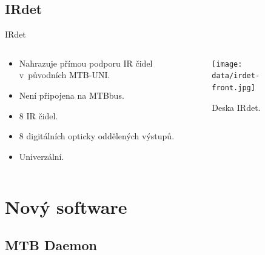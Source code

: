 \documentclass[aspectratio=169]{beamer}
\begin{document}

\subsection{IRdet}

\begin{frame}{IRdet}
\begin{columns}
	\begin{column}{.7\textwidth}
		\begin{itemize}
		\item Nahrazuje přímou podporu IR čidel v původních MTB-UNI.
		\item Není připojena na MTBbus.
		\item 8 IR čidel.
		\item 8 digitálních opticky oddělených výstupů.
		\item Univerzální.
		\end{itemize}
	\end{column}
	\begin{column}{.3\textwidth}
		\begin{figure}
		\texttt{[image: data/irdet-front.jpg]}
		\caption{Deska IRdet.}
		\end{figure}
	\end{column}
\end{columns}
\end{frame}


\section{Nový software}
\subsection{MTB Daemon}
\end{document}
